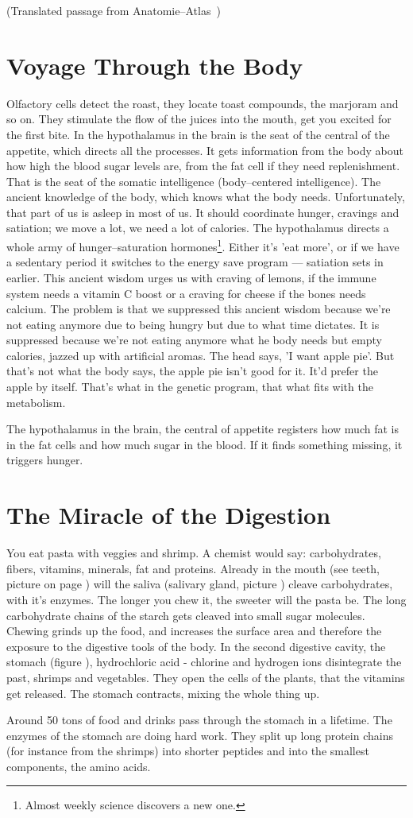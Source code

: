\documentclass[../main.tex]{subfiles}
\begin{document}
(Translated passage from Anatomie--Atlas~\cite{AAtlas})
\section{Voyage Through the Body}
Olfactory cells detect the roast, they locate toast compounds, the marjoram and so on.
They stimulate the flow of the juices into the mouth, get you excited for the first bite.
In the hypothalamus in the brain is the seat of the central of the appetite, which directs all the processes.
It gets information from the body about how high the blood sugar levels are, from the fat cell if they need replenishment.
That is the seat of the somatic intelligence (body--centered intelligence).
The ancient knowledge of the body, which knows what the body needs.
Unfortunately, that part of us is asleep in most of us.
It should coordinate hunger, cravings and satiation; we move a lot, we need a lot of calories.
The hypothalamus directs a whole army of hunger--saturation hormones\footnote{Almost weekly science discovers a new one.}.
Either it's 'eat more', or if we have a sedentary period it switches to the energy save program --- satiation sets in earlier.
This ancient wisdom urges us with craving of lemons, if the immune system needs a vitamin C boost or a craving for cheese if the bones needs calcium.
The problem is that we suppressed this ancient wisdom because we're not eating anymore due to being hungry but due to what time dictates.
It is suppressed because we're not eating anymore what he body needs but empty calories, jazzed up with artificial aromas.
The head says, 'I want apple pie'. But that's not what the body says, the apple pie isn't good for it. It'd prefer the apple by itself.
That's what in the genetic program, that what fits with the metabolism.

The hypothalamus in the brain, the central of appetite registers how much fat is in the fat cells and how much sugar in the blood.
If it finds something missing, it triggers hunger.

\section{The Miracle of the Digestion}

You eat pasta with veggies and shrimp.
A chemist would say: carbohydrates, fibers, vitamins, minerals, fat and proteins.
Already in the mouth (see teeth, picture %
on page %
)
will the saliva (salivary gland, picture %
) cleave carbohydrates, with it's enzymes.
The longer you chew it, the sweeter will the pasta be.
The long carbohydrate chains of the starch gets cleaved into small sugar molecules.
Chewing grinds up the food, and increases the surface area and therefore the exposure to the digestive tools of the body. 
In the second digestive cavity, the stomach (figure %
), hydrochloric acid - chlorine and hydrogen ions disintegrate the past, shrimps and vegetables.
They open the cells of the plants, that the vitamins get released.
The stomach contracts, mixing the whole thing up.

Around 50 tons of food and drinks pass through the stomach in a lifetime.
The enzymes of the stomach are doing hard work.
They split up long protein chains (for instance from the shrimps) into shorter peptides and into the smallest components, the amino acids.
\end{document}
